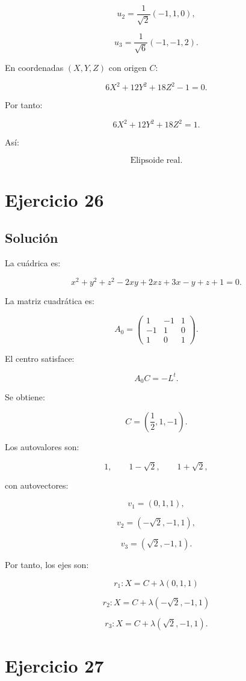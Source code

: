 \documentclass[11pt,a4paper]{article}
\begin{document}
\[
u_2=
\frac1{\sqrt2}(-1,1,0),
\]

\[
u_3=
\frac1{\sqrt6}(-1,-1,2).
\]

En coordenadas \((X,Y,Z)\) con origen \(C\):

\[
6X^2+12Y^2+18Z^2-1=0.
\]

Por tanto:

\[
\boxed{
6X^2+12Y^2+18Z^2=1.
}
\]

Así:

\[
\boxed{\text{Elipsoide real}.}
\]

\section{Ejercicio 26}
\subsection{Solución}

La cuádrica es:

\[
x^2+y^2+z^2-2xy+2xz+3x-y+z+1=0.
\]

La matriz cuadrática es:

\[
A_0=
\begin{pmatrix}
1&-1&1\\
-1&1&0\\
1&0&1
\end{pmatrix}.
\]

El centro satisface:

\[
A_0C=-L^t.
\]

Se obtiene:

\[
\boxed{
C=
\left(
\frac12,1,-1
\right).
}
\]

Los autovalores son:

\[
1,
\qquad
1-\sqrt2,
\qquad
1+\sqrt2,
\]

con autovectores:

\[
v_1=(0,1,1),
\]

\[
v_2=(-\sqrt2,-1,1),
\]

\[
v_3=(\sqrt2,-1,1).
\]

Por tanto, los ejes son:

\[
\boxed{
r_1:
X=C+\lambda(0,1,1)
}
\]

\[
\boxed{
r_2:
X=C+\lambda(-\sqrt2,-1,1)
}
\]

\[
\boxed{
r_3:
X=C+\lambda(\sqrt2,-1,1).
}
\]

\section{Ejercicio 27}
\end{document}
